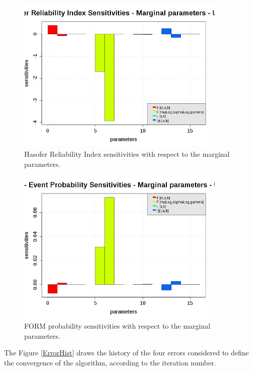              \begin{figure}[H]
               \begin{center}
                 \includegraphics[width=10cm]{Figures/HasoferReliabilityIndexMarginalSensitivityDrawing.png}
               \end{center}
               \caption{Hasofer Reliability Index sensitivities with respect to the marginal parameters.}
               \label{FORMIndexSensitivity}
             \end{figure}

             \begin{figure}[H]
               \begin{center}
                 \includegraphics[width=10cm]{Figures/EventProbabilityIndexMarginalSensitivityDrawing.png}
               \end{center}
               \caption{FORM probability sensitivities with respect to the marginal parameters.}
               \label{FORMProbaSensitivity}
             \end{figure}

The Figure \ref{ErrorHist} draws the history of the four errors considered to define the convergence of the algorithm, according to the iteration number.

